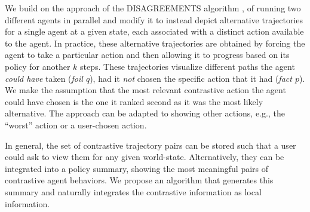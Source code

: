 \documentclass{ecai}
\begin{document}
We build on the approach of the DISAGREEMENTS algorithm \cite{amitai2021don}, of running two different agents in parallel and modify it to instead depict alternative trajectories for a single agent at a given state, each associated with a distinct action available to the agent. In practice, these alternative trajectories are obtained by forcing the agent to take a particular action and then allowing it to progress based on its policy for another $k$ steps. These trajectories visualize different paths the agent \emph{could have} taken (\emph{foil $q$}), had it \emph{not} chosen the specific action that it had (\emph{fact $p$}). We make the assumption that the most relevant contrastive action the agent could have chosen is the one it ranked second as it was the most likely alternative. The approach can be adapted to showing other actions, e.g., the ``worst'' action or a user-chosen action. 

In general, the set of contrastive trajectory pairs can be stored such that a user could ask to view them for any given world-state. Alternatively, they can be integrated into a policy summary, showing the most meaningful pairs of contrastive agent behaviors. We propose an algorithm that generates this summary and naturally integrates the contrastive information as local information.


\begin{table}
    \centering
    \small
    \caption{Contrastive highlights algorithm parameters and study values.}
    \label{tb:parameters}
\end{table}
\end{document}
